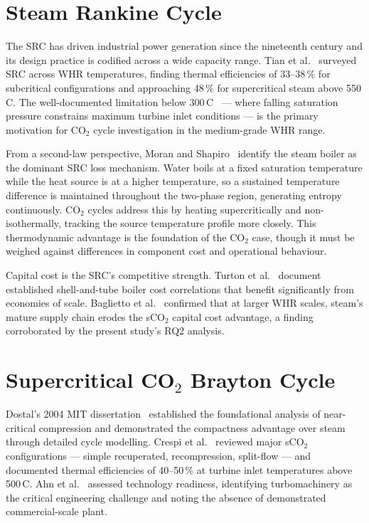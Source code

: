 \section{Steam Rankine Cycle}
\label{sec:lit_src}

The SRC has driven industrial power generation since the nineteenth century
and its design practice is codified across a wide capacity range. Tian et
al.~\cite{Tian2022} surveyed SRC across WHR temperatures, finding thermal
efficiencies of 33--38\,\% for subcritical configurations and approaching
48\,\% for supercritical steam above 550\,\textdegree C. The well-documented
limitation below 300\,\textdegree C~\cite{Tchanche2011} --- where falling
saturation pressure constrains maximum turbine inlet conditions --- is the
primary motivation for CO$_2$ cycle investigation in the medium-grade
WHR range.

From a second-law perspective, Moran and Shapiro~\cite{Moran2018} identify
the steam boiler as the dominant SRC loss mechanism. Water boils at a fixed
saturation temperature while the heat source is at a higher temperature, so
a sustained temperature difference is maintained throughout the two-phase
region, generating entropy continuously. CO$_2$ cycles address this by
heating supercritically and non-isothermally, tracking the source temperature
profile more closely. This thermodynamic advantage is the foundation of the
CO$_2$ case, though it must be weighed against differences in component cost
and operational behaviour.

Capital cost is the SRC's competitive strength. Turton et
al.~\cite{Turton2012} document established shell-and-tube boiler cost
correlations that benefit significantly from economies of scale. Baglietto et
al.~\cite{Baglietto2023} confirmed that at larger WHR scales, steam's mature
supply chain erodes the sCO$_2$ capital cost advantage, a finding corroborated
by the present study's RQ2 analysis.

\section{Supercritical CO$_2$ Brayton Cycle}
\label{sec:lit_sco2}

Dostal's 2004 MIT dissertation~\cite{Dostal2004} established the foundational
analysis of near-critical compression and demonstrated the compactness
advantage over steam through detailed cycle modelling. Crespi et
al.~\cite{Crespi2017} reviewed major sCO$_2$ configurations --- simple
recuperated, recompression, split-flow --- and documented thermal efficiencies
of 40--50\,\% at turbine inlet temperatures above 500\,\textdegree C. Ahn et
al.~\cite{Ahn2015} assessed technology readiness, identifying turbomachinery
as the critical engineering challenge and noting the absence of demonstrated
commercial-scale plant.

